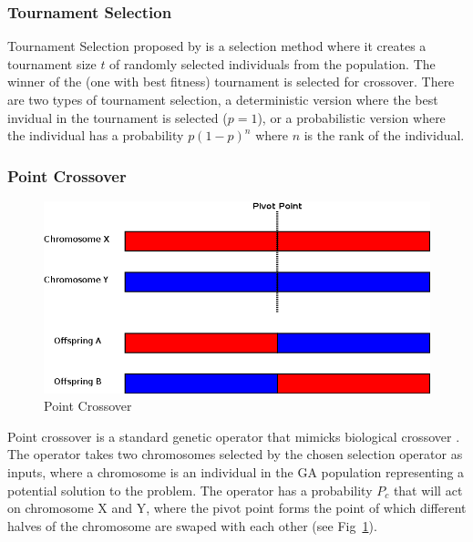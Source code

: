 \subsubsection{Tournament Selection}
Tournament Selection proposed by \cite{miller1995genetic} is a selection method where it creates a tournament size $t$ of randomly selected individuals from the population. The winner of the (one with best fitness) tournament is selected for crossover. There are two types of tournament selection, a deterministic version where the best invidual in the tournament is selected ($p = 1$), or a probabilistic version where the individual has a probability $p (1 - p)^{n}$  where $n$ is the rank of the individual.


\subsubsection{Point Crossover}
\begin{figure}
	\vspace{-0.4cm}
	\includegraphics[width=\linewidth]{sections/imgs/ga/ga_crossover.png}
	\caption{Point Crossover}
	\label{fig:ga_point_crossover}
	\vspace{-0.9cm}
\end{figure}

Point crossover is a standard genetic operator that mimicks biological crossover \cite{mitchell1998introduction}. The operator takes two chromosomes selected by the chosen selection operator as inputs, where a chromosome is an individual in the GA population representing a potential solution to the problem. The operator has a probability $P_{c}$ that will act on chromosome X and Y, where the pivot point forms the point of which different halves of the chromosome are swaped with each other (see Fig~\ref{fig:ga_point_crossover}).

\newpage
